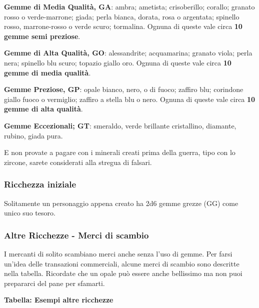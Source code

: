\documentclass[12pt,a4paper,twoside,openany]{book}
\begin{document}
\begin{multicols}{2}
\textbf{Gemme di Media Qualità, GA}: ambra; ametista; crisoberillo; corallo; granato rosso o verde-marrone; giada; perla bianca, dorata, rosa o argentata; spinello rosso, marrone-rosso o verde scuro; tormalina. Ognuna di queste vale circa \textbf{10 gemme semi preziose}.

\textbf{Gemme di Alta Qualità, GO}: alessandrite; acquamarina; granato viola; perla nera; spinello blu scuro; topazio giallo oro.  Ognuna di queste vale circa \textbf{10 gemme di media qualità}.

\textbf{Gemme Preziose, GP}: opale bianco, nero, o di fuoco; zaffiro blu; corindone giallo fuoco o vermiglio; zaffiro a stella blu o nero. Ognuna di queste vale circa \textbf{10 gemme di alta qualità}.

\textbf{Gemme Eccezionali; GT}: smeraldo, verde brillante cristallino, diamante, rubino, giada pura.

E non provate a pagare con i minerali creati prima della guerra, tipo con lo zircone, sarete considerati alla stregua di falsari.

\subsubsection{Ricchezza iniziale}

Solitamente un personaggio appena creato ha 2d6 gemme grezze (GG) come unico suo tesoro.

\subsubsection{Altre Ricchezze - Merci di scambio}

I mercanti di solito scambiano merci anche senza l'uso di gemme.
Per farsi un'idea delle transazioni commerciali, alcune merci di scambio sono descritte nella tabella. Ricordate che un opale può essere anche bellissimo ma non puoi prepararci del pane per sfamarti.

\medskip

\textbf{Tabella: Esempi altre ricchezze}

\medskip



\end{multicols}
\end{document}
